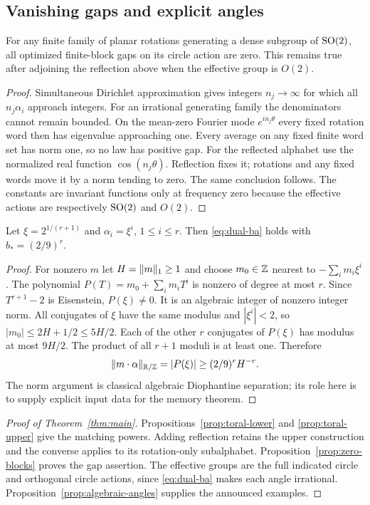 \subsection{Vanishing gaps and explicit angles}
\begin{proposition}\label{prop:zero-blocks}
For any finite family of planar rotations generating a dense subgroup of $\operatorname{SO}(2)$, all optimized finite-block gaps on its circle action are zero. This remains true after adjoining the reflection above when the effective group is $O(2)$.
\end{proposition}
\begin{proof}
Simultaneous Dirichlet approximation gives integers $n_j\to\infty$ for which all $n_j\alpha_i$ approach integers. For an irrational generating family the denominators cannot remain bounded. On the mean-zero Fourier mode $e^{in_j\theta}$ every fixed rotation word then has eigenvalue approaching one. Every average on any fixed finite word set has norm one, so no law has positive gap. For the reflected alphabet use the normalized real function $\cos(n_j\theta)$. Reflection fixes it; rotations and any fixed words move it by a norm tending to zero. The same conclusion follows. The constants are invariant functions only at frequency zero because the effective actions are respectively $\operatorname{SO}(2)$ and $O(2)$.
\end{proof}

\begin{proposition}\label{prop:algebraic-angles}
Let $\xi=2^{1/(r+1)}$ and $\alpha_i=\xi^i$, $1\le i\le r$. Then \eqref{eq:dual-ba} holds with $b_*=(2/9)^r$.
\end{proposition}
\begin{proof}
For nonzero $m$ let $H=\lVert m\rVert_1\ge1$ and choose $m_0\in\mathbb Z$ nearest to $-\sum_i m_i\xi^i$. The polynomial $P(T)=m_0+\sum_i m_iT^i$ is nonzero of degree at most $r$. Since $T^{r+1}-2$ is Eisenstein, $P(\xi)\ne0$. It is an algebraic integer of nonzero integer norm. All conjugates of $\xi$ have the same modulus and $|\xi^i|<2$, so $|m_0|\le2H+1/2\le5H/2$. Each of the other $r$ conjugates of $P(\xi)$ has modulus at most $9H/2$. The product of all $r+1$ moduli is at least one. Therefore
\[
 \lVert m\cdot\alpha\rVert_{\mathbb R/\mathbb Z}=|P(\xi)|\ge(2/9)^rH^{-r}.
\]
The norm argument is classical algebraic Diophantine separation; its role here is to supply explicit input data for the memory theorem.
\end{proof}

\begin{proof}[Proof of Theorem~\ref{thm:main}]
Propositions~\ref{prop:toral-lower} and \ref{prop:toral-upper} give the matching powers. Adding reflection retains the upper construction and the converse applies to its rotation-only subalphabet. Proposition~\ref{prop:zero-blocks} proves the gap assertion. The effective groups are the full indicated circle and orthogonal circle actions, since \eqref{eq:dual-ba} makes each angle irrational. Proposition~\ref{prop:algebraic-angles} supplies the announced examples.
\end{proof}

